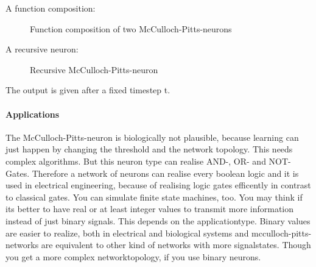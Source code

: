 \documentclass[10pt,a4paper,DIV=11]{scrreprt}
\begin{document}
A function composition:

\begin{figure}[H]
	\centering
	\caption{Function composition of two McCulloch-Pitts-neurons}
	\label{fig:pitts2}
\end{figure}

A recursive neuron:

\begin{figure}[H]
	\centering
	\caption{Recursive McCulloch-Pitts-neuron}
	\label{fig:pitts3}
\end{figure}

The output is given after a fixed timestep t.

\paragraph{Applications}
The McCulloch-Pitts-neuron is biologically not plausible, because learning
can just happen by changing the threshold and the network topology. This
needs complex algorithms.
But this neuron type can realise AND-, OR- and NOT-Gates.
Therefore a network of neurons can realise every boolean logic and it is used in electrical engineering, because of realising logic gates efficently in contrast to classical gates. You can simulate finite state machines, too.
You may think if its better to have real or at least integer values to transmit more information instead of just binary signals. This depends on the applicationtype. Binary values are easier to realize, both in electrical and biological systems and mcculloch-pitts-networks are equivalent to other kind of networks with more signalstates. Though you get a more complex networktopology, if you use binary neurons.
\end{document}
